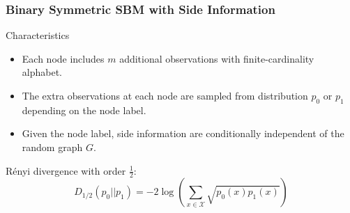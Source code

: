 \documentclass[notheorems]{beamer}
\begin{document}
\begin{frame}
\frametitle{Binary Symmetric SBM with Side Information}
\begin{block}{Characteristics}
\begin{itemize}
	\item   Each node includes $m$ additional observations with
	finite-cardinality alphabet.
	\item The extra observations at each node are sampled from distribution $p_0$
	or $p_1$ depending on the node label.
	\item Given the node label, side information are conditionally independent of the random
	graph $G$.
\end{itemize}
\end{block}
Rényi divergence with order $\frac{1}{2}$:
\begin{equation*}
	D_{1/2}(p_0 || p_1) = -2\log(\sum_{x \in \mathcal{X}} \sqrt{p_0(x)p_1(x)} )
\end{equation*}
\end{frame}
\end{document}
